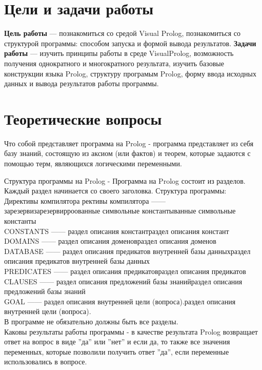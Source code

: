 \chapter{Цели и задачи работы}
\textbf{Цель работы} --- познакомиться со средой Visual Prolog, познакомиться со структурой программы: способом запуска и формой вывода результатов.
\textbf{Задачи работы} --- изучить принципы работы в среде VisualProlog, возможность получения однократного и многократного результата, изучить базовые конструкции языка Prolog, структуру програмым Prolog, форму ввода исходных данных и вывода результатов работы программы.

\chapter{Теоретические вопросы}
Что собой представляет программа на Prolog - программа представляет из себя базу знаний, состоящую из аксиом (или фактов) и теорем, которые задаются с помощью терм, являющихся логическими переменными.

Структура программы на Prolog - Программа на Prolog состоит из разделов. Каждый раздел начинается со своего заголовка. Структура программы:\\
Директивы компилятора рективы компилятора —— зарезервизарезервирроованные символьные константыванные символьные константы\\
CONSTANTS —— раздел описания константраздел описания констант\\
DOMAINS —— раздел описания доменовраздел описания доменов\\
DATABASE —— раздел описания предикатов внутренней базы данныхраздел описания предикатов внутренней базы данных\\
PREDICATES —— раздел описания предикатовраздел описания предикатов\\
CLAUSES —— раздел описания предложений базы знанийраздел описания предложений базы знаний\\
GOAL —— раздел описания внутренней цели (вопроса).раздел описания внутренней цели (вопроса).\\
В программе не обязательно должны быть все разделы.\\

Каковы результаты работы программы - в качестве результата Prolog возвращает ответ на вопрос в виде ''да'' или ''нет'' и если да, то также все значения переменных, которые позволили получить ответ ''да'', если переменные использовались в вопросе.\\

